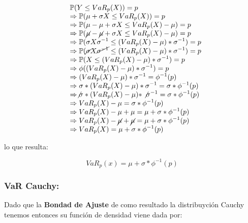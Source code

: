 \documentclass[10pt,]{article}
\begin{document}
\[
\begin{array}{rl}
&\displaystyle \mathbb{P}(Y \leq VaR_{p}(X)) = p\\
&\displaystyle \Rightarrow \mathbb{P}(\mu + \sigma X \leq VaR_{p}(X)) = p\\
&\displaystyle \Rightarrow \mathbb{P}(\mu - \mu + \sigma X \leq VaR_{p}(X)- \mu) = p\\
&\displaystyle \Rightarrow \mathbb{P}(\cancel{\mu} - \cancel{\mu} + \sigma X \leq VaR_{p}(X)- \mu) = p\\
&\displaystyle \Rightarrow \mathbb{P}(\sigma X \sigma^{-1} \leq (VaR_{p}(X) -\mu) * \sigma^{-1}) = p\\
&\displaystyle \Rightarrow \mathbb{P}(\cancel{\sigma} X \cancel{\sigma^{-1}} \leq (VaR_{p}(X) -\mu) * \sigma^{-1}) = p\\
&\displaystyle \Rightarrow \mathbb{P}(X \leq (VaR_{p}(X) -\mu) * \sigma^{-1}) = p\\
&\displaystyle \Rightarrow \phi((VaR_{p}(X) -\mu) * \sigma^{-1}) = p\\
&\displaystyle \Rightarrow (VaR_{p}(X) -\mu) * \sigma^{-1} = \phi^{-1}(p)\\
&\displaystyle \Rightarrow \sigma * {(VaR_{p}(X) -\mu) * \sigma^{-1}} = \sigma * \phi^{-1}(p)\\
&\displaystyle \Rightarrow \not{\sigma} * {(VaR_{p}(X) -\mu) * \not{\sigma^{-1}}} = \sigma * \phi^{-1}(p)\\
&\displaystyle \Rightarrow VaR_{p}(X) -\mu = \sigma * \phi^{-1}(p)\\
&\displaystyle \Rightarrow VaR_{p}(X) -\mu + \mu = \mu + \sigma * \phi^{-1}(p)\\
&\displaystyle \Rightarrow VaR_{p}(X) -\cancel{\mu} + \cancel{\mu} = \mu + \sigma * \phi^{-1}(p)\\
&\displaystyle \Rightarrow VaR_{p}(X) = \mu + \sigma * \phi^{-1}(p)
\end{array}\]

lo que resulta:

\[VaR_p(x)=\mu+\sigma* \phi^{-1}(p)\]

\hypertarget{var-cauchy}{%
\subsubsection{\texorpdfstring{\textbf{VaR
Cauchy:}}{VaR Cauchy:}}\label{var-cauchy}}

Dado que la \textbf{Bondad de Ajuste} de como resultado la distribuyción
Cauchy tenemos entonces su función de densidad viene dada por:
\end{document}

